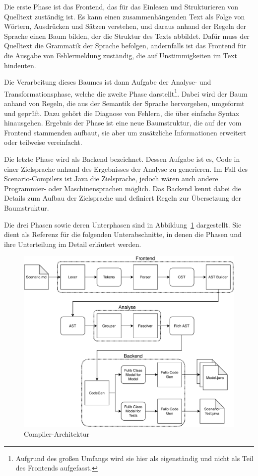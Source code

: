 Die erste Phase ist das Frontend, das für das Einlesen und Strukturieren von Quelltext zuständig ist.
Es kann einen zusammenhängenden Text als Folge von Wörtern, Ausdrücken und Sätzen verstehen, und daraus anhand der Regeln der Sprache einen Baum bilden, der die Struktur des Texts abbildet.
Dafür muss der Quelltext die Grammatik der Sprache befolgen, andernfalls ist das Frontend für die Ausgabe von Fehlermeldung zuständig, die auf Unstimmigkeiten im Text hindeuten.

Die Verarbeitung dieses Baumes ist dann Aufgabe der Analyse- und Transformationsphase, welche die zweite Phase darstellt\footnote{Aufgrund des großen Umfangs wird sie hier als eigenständig und nicht als Teil des Frontends aufgefasst.}.
Dabei wird der Baum anhand von Regeln, die aus der Semantik der Sprache hervorgehen, umgeformt und geprüft.
Dazu gehört die Diagnose von Fehlern, die über einfache Syntax hinausgehen.
Ergebnis der Phase ist eine neue Baumstruktur, die auf der vom Frontend stammenden aufbaut, sie aber um zusätzliche Informationen erweitert oder teilweise vereinfacht.

Die letzte Phase wird als Backend bezeichnet.
Dessen Aufgabe ist es, Code in einer Zielsprache anhand des Ergebnisses der Analyse zu generieren.
Im Fall des Scenario-Compilers ist Java die Zielsprache, jedoch wären auch andere Programmier- oder Maschinensprachen möglich.
Das Backend kennt dabei die Details zum Aufbau der Zielsprache  und definiert Regeln zur Übersetzung der Baumstruktur.

Die drei Phasen sowie deren Unterphasen sind in Abbildung~\ref{fig:compiler-architecture} dargestellt.
Sie dient als Referenz für die folgenden Unterabschnitte, in denen die Phasen und ihre Unterteilung im Detail erläutert werden.

\begin{figure}
    \includegraphics[width=\textwidth]{chapter/fulib-scenarios/img/architecture.pdf}
    \caption{Compiler-Architektur}
    \label{fig:compiler-architecture}
\end{figure}

